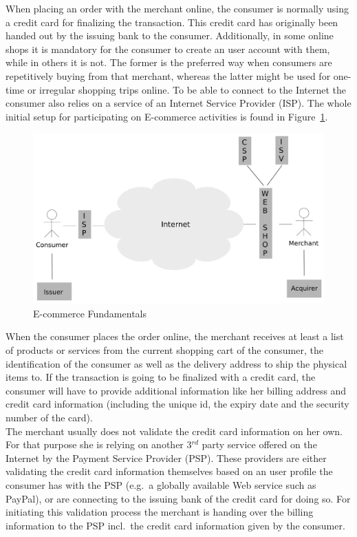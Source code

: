 When placing an order with the merchant online, the consumer is normally using a credit card for finalizing the transaction. This credit card has originally been handed out by the issuing bank to the consumer. Additionally, in some online shops it is mandatory for the consumer to create an user account with them, while in others it is not. The former is the preferred way when consumers are repetitively buying from that merchant, whereas the latter might be used for one-time or irregular shopping trips online. To be able to connect to the Internet the consumer also relies on a service of an Internet Service Provider (\gls{ISP}). The whole initial setup for participating on E-commerce activities is found in Figure~\ref{fig:images_ecommerce_scenario}.\@

\begin{figure}[H]
	\centering
		\includegraphics[width=0.8\columnwidth]{images/e-commerce-scenario.pdf}
	\caption{E-commerce Fundamentals}
\label{fig:images_ecommerce_scenario}
\end{figure}

When the consumer places the order online, the merchant receives at least a list of products or services from the current shopping cart of the consumer, the identification of the consumer as well as the delivery address to ship the physical items to. If the transaction is going to be finalized with a credit card, the consumer will have to provide additional information like her billing address and credit card information (including the unique id, the expiry date and the security number of the card). \\

The merchant usually does not validate the credit card information on her own. For that purpose she is relying on another 3$^{rd}$ party service offered on the Internet by the Payment Service Provider (\gls{PSP}). These providers are either validating the credit card information themselves based on an user profile the consumer has with the \gls{PSP} (e.g.\ a globally available Web service such as PayPal), or are connecting to the issuing bank of the credit card for doing so. For initiating this validation process the merchant is handing over the billing information to the \gls{PSP} incl.\ the credit card information given by the consumer. \\

